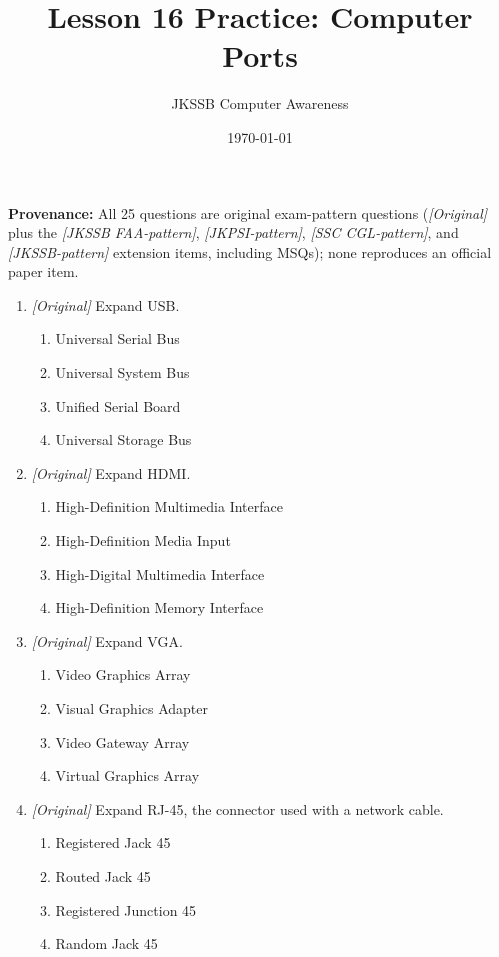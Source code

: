 \documentclass[11pt]{article}
\title{Lesson 16 Practice: Computer Ports}
\author{JKSSB Computer Awareness}
\date{\today}
\begin{document}
\maketitle
\noindent\textbf{Provenance:} All 25 questions are original exam-pattern questions (\textit{[Original]} plus the \textit{[JKSSB FAA-pattern]}, \textit{[JKPSI-pattern]}, \textit{[SSC CGL-pattern]}, and \textit{[JKSSB-pattern]} extension items, including MSQs); none reproduces an official paper item.

\begin{enumerate}[label=\textbf{Q\arabic*.}, leftmargin=*]
\item \textit{[Original]} Expand USB.
  \begin{enumerate}[label=\Alph*.]
    \item Universal Serial Bus
    \item Universal System Bus
    \item Unified Serial Board
    \item Universal Storage Bus
  \end{enumerate}
\item \textit{[Original]} Expand HDMI.
  \begin{enumerate}[label=\Alph*.]
    \item High-Definition Multimedia Interface
    \item High-Definition Media Input
    \item High-Digital Multimedia Interface
    \item High-Definition Memory Interface
  \end{enumerate}
\item \textit{[Original]} Expand VGA.
  \begin{enumerate}[label=\Alph*.]
    \item Video Graphics Array
    \item Visual Graphics Adapter
    \item Video Gateway Array
    \item Virtual Graphics Array
  \end{enumerate}
\item \textit{[Original]} Expand RJ-45, the connector used with a network
  cable.
  \begin{enumerate}[label=\Alph*.]
    \item Registered Jack 45
    \item Routed Jack 45
    \item Registered Junction 45
    \item Random Jack 45

\end{enumerate}
\end{enumerate}
\end{document}
